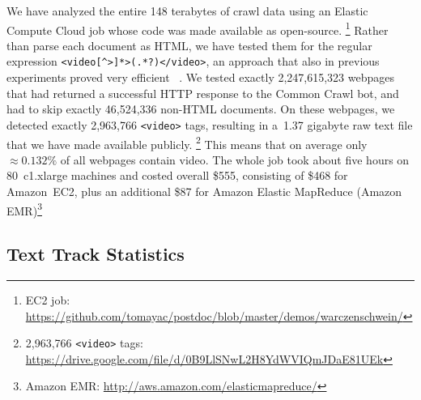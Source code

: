 \documentclass{sig-alternate}
\newcommand{\inlinelistingsize}{\fontsize{8pt}{11pt}}
\let\oldurl\url
\renewcommand{\url}[1]{\inlinelistingsize\oldurl{#1}}
\begin{document}
We have analyzed the entire 148 terabytes of crawl data
using an Elastic Compute Cloud job
whose code was made available as open-source.%
\footnote{EC2 job:
\url{https://github.com/tomayac/postdoc/blob/master/demos/warczenschwein/}}
Rather than parse each document as HTML,
we have tested them for the regular expression
\texttt{<video[\^{}>]*>(.*?)</video>},
an approach that also in previous experiments
proved very efficient%
~\cite{bizer2013deployment,muhleisen2012web}.
We tested exactly 2,247,615,323 webpages
that had returned a successful HTTP response to the Common Crawl bot,
and had to skip exactly 46,524,336  non-HTML documents.
On these webpages, we detected exactly
2,963,766 \texttt{<video>} tags,
resulting in a~1.37 gigabyte raw text file
that we have made available publicly.%
\footnote{2,963,766 \texttt{<video>} tags: \url{https://drive.google.com/file/d/0B9LlSNwL2H8YdWVIQmJDaE81UEk}}
This means that on average only ${\approx}0.132\%$ of all webpages contain video.
The whole job took about five hours on
80~c1.xlarge machines and costed overall \$555,
consisting of \$468 for Amazon~EC2,
plus an additional \$87 for Amazon Elastic MapReduce
 (Amazon EMR)\footnote{Amazon EMR:
\url{http://aws.amazon.com/elasticmapreduce/}}

\subsection{Text Track Statistics}
\label{sec:text-track-statistics}
\end{document}
